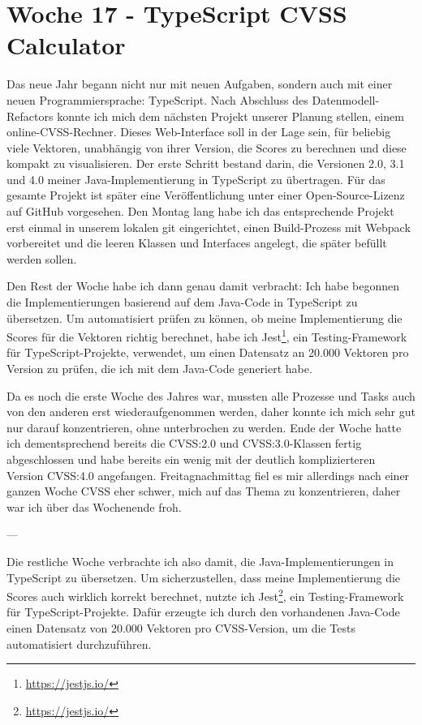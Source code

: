 \section{Woche 17 - TypeScript CVSS Calculator} \label{sec:bericht-wo-17}



Das neue Jahr begann nicht nur mit neuen Aufgaben, sondern auch mit einer neuen Programmiersprache: TypeScript.
Nach Abschluss des Datenmodell-Refactors konnte ich mich dem nächsten Projekt unserer Planung stellen, einem online-CVSS-Rechner.
Dieses Web-Interface soll in der Lage sein, für beliebig viele Vektoren, unabhängig von ihrer Version, die Scores zu berechnen und diese kompakt zu visualisieren.
Der erste Schritt bestand darin, die Versionen 2.0, 3.1 und 4.0 meiner Java-Implementierung in TypeScript zu übertragen.
Für das gesamte Projekt ist später eine Veröffentlichung unter einer Open-Source-Lizenz auf GitHub vorgesehen.
Den Montag lang habe ich das entsprechende Projekt erst einmal in unserem lokalen git eingerichtet, einen Build-Prozess mit Webpack vorbereitet und die leeren Klassen und Interfaces angelegt, die später befüllt werden sollen.


Den Rest der Woche habe ich dann genau damit verbracht:
Ich habe begonnen die Implementierungen basierend auf dem Java-Code in TypeScript zu übersetzen.
Um automatisiert prüfen zu können, ob meine Implementierung die Scores für die Vektoren richtig berechnet, habe ich Jest\footnote{\url{https://jestjs.io/}}, ein Testing-Framework für TypeScript-Projekte, verwendet, um einen Datensatz an 20.000 Vektoren pro Version zu prüfen, die ich mit dem Java-Code generiert habe.

Da es noch die erste Woche des Jahres war, mussten alle Prozesse und Tasks auch von den anderen erst wiederaufgenommen werden, daher konnte ich mich sehr gut nur darauf konzentrieren, ohne unterbrochen zu werden.
Ende der Woche hatte ich dementsprechend bereits die CVSS:2.0 und CVSS:3.0-Klassen fertig abgeschlossen und habe bereits ein wenig mit der deutlich komplizierteren Version CVSS:4.0 angefangen.
Freitagnachmittag fiel es mir allerdings nach einer ganzen Woche CVSS eher schwer, mich auf das Thema zu konzentrieren, daher war ich über das Wochenende froh.

---

Die restliche Woche verbrachte ich also damit, die Java-Implementierungen in TypeScript zu übersetzen.
Um sicherzustellen, dass meine Implementierung die Scores auch wirklich korrekt berechnet, nutzte ich Jest\footnote{\url{https://jestjs.io/}}, ein Testing-Framework für TypeScript-Projekte.
Dafür erzeugte ich durch den vorhandenen Java-Code einen Datensatz von 20.000 Vektoren pro CVSS-Version, um die Tests automatisiert durchzuführen.

